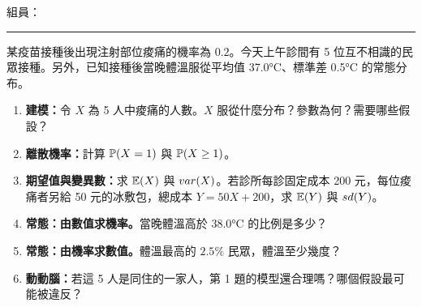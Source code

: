 
\renewcommand{\chapterlabel}{第 4 章\ 隨機變數與機率分布}
\newcommand{\handoutkind}{課堂分組練習}

\newenvironment{questions}{\begin{enumerate}[leftmargin=*, label=\textbf{\arabic*.}, itemsep=0pt]}{\end{enumerate}}
\newcommand{\blank}{\par\vspace{\stretch{1}}}
\newcommand{\members}{\small 組員：\rule{0.8\textwidth}{0.4pt}\par\medskip}



\members
\begin{scenario}
    某疫苗接種後出現注射部位痠痛的機率為 $0.2$。今天上午診間有 5 位互不相識的民眾接種。另外，已知接種後當晚體溫服從平均值 37.0°C、標準差 0.5°C 的常態分布。
\end{scenario}
\begin{questions}
    \item \textbf{建模：}令 $X$ 為 5 人中痠痛的人數。$X$ 服從什麼分布？參數為何？需要哪些假設？ \blank
    \item \textbf{離散機率：}計算 $\mathbb{P}(X=1)$ 與 $\mathbb{P}(X \ge 1)$。 \blank
    \item \textbf{期望值與變異數：}求 $\mathbb{E}(X)$ 與 $var(X)$。若診所每診固定成本 200 元，每位痠痛者另給 50 元的冰敷包，總成本 $Y = 50X + 200$，求 $\mathbb{E}(Y)$ 與 $sd(Y)$。 \blank
    \item \textbf{常態：由數值求機率。}當晚體溫高於 38.0°C 的比例是多少？ \blank
    \item \textbf{常態：由機率求數值。}體溫最高的 $2.5\%$ 民眾，體溫至少幾度？ \blank
    \item \textbf{動動腦：}若這 5 人是同住的一家人，第 1 題的模型還合理嗎？哪個假設最可能被違反？ \blank
\end{questions}
\newpage

